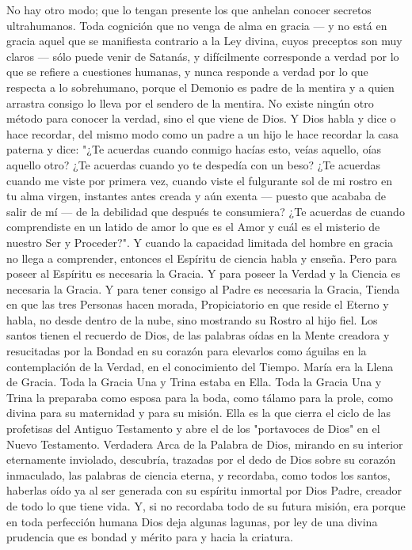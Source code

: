 \documentclass[12pt]{book} %
\begin{document}
No hay otro modo; que lo tengan presente los que anhelan conocer secretos ultrahumanos. Toda cognición que no 
venga de alma en gracia — y no está en gracia aquel que se manifiesta contrario a la Ley divina, cuyos preceptos son muy claros — sólo puede venir de Satanás, y difícilmente corresponde a verdad por lo que se refiere a cuestiones humanas, y nunca responde a verdad por lo que respecta a lo sobrehumano, porque el Demonio es padre de la mentira y a quien arrastra consigo lo lleva por el sendero de la mentira. No existe ningún otro método para conocer la verdad, sino el que viene de Dios. Y Dios habla y dice o hace recordar, del mismo modo como un padre a un hijo le hace recordar la casa paterna y dice: "¿Te acuerdas cuando conmigo hacías esto, veías aquello, oías aquello otro? ¿Te acuerdas cuando yo te despedía con un beso? ¿Te acuerdas cuando me viste por primera vez, cuando viste el fulgurante sol de mi rostro en tu alma virgen, instantes antes creada y aún exenta — puesto que acababa de salir de mí — de la debilidad que después te consumiera? ¿Te acuerdas de cuando comprendiste en un latido de amor lo que es el Amor y cuál es el misterio de nuestro Ser y Proceder?". Y cuando la capacidad limitada del hombre en gracia no llega a comprender, entonces el Espíritu de ciencia habla y enseña. 
Pero para poseer al Espíritu es necesaria la Gracia. Y para poseer la Verdad y la Ciencia es necesaria la Gracia. Y para tener consigo al Padre es necesaria la Gracia, Tienda en que las tres Personas hacen morada, Propiciatorio en que reside el Eterno y habla, no desde dentro de la nube, sino mostrando su Rostro al hijo fiel. Los santos tienen el recuerdo de Dios, de las palabras oídas en la Mente creadora y resucitadas por la Bondad en su corazón para elevarlos como águilas en la contemplación de la Verdad, en el conocimiento del Tiempo. 
María era la Llena de Gracia. Toda la Gracia Una y Trina estaba en Ella. Toda la Gracia Una y Trina la preparaba como 
esposa para la boda, como tálamo para la prole, como divina para su maternidad y para su misión. Ella es la que cierra el ciclo de las profetisas del Antiguo Testamento y abre el de los "portavoces de Dios" en el Nuevo Testamento. 
Verdadera Arca de la Palabra de Dios, mirando en su interior eternamente inviolado, descubría, trazadas por el dedo de Dios sobre su corazón inmaculado, las palabras de ciencia eterna, y recordaba, como todos los santos, haberlas oído ya al ser generada con su espíritu inmortal por Dios Padre, creador de todo lo que tiene vida. Y, si no recordaba todo de su futura misión, era porque en toda perfección humana Dios deja algunas lagunas, por ley de una divina prudencia que es bondad y mérito para y hacia la criatura. 
\end{document}
